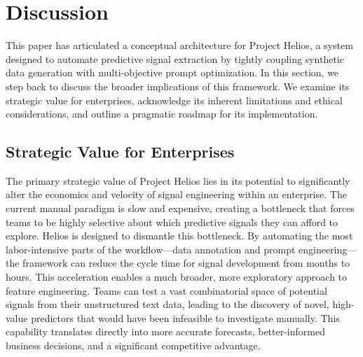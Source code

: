 \documentclass{article}
\begin{document}
\section{Discussion}
\label{sec:discussion}
This paper has articulated a conceptual architecture for Project Helios, a system designed to automate predictive signal extraction by tightly coupling synthetic data generation with multi-objective prompt optimization. In this section, we step back to discuss the broader implications of this framework. We examine its strategic value for enterprises, acknowledge its inherent limitations and ethical considerations, and outline a pragmatic roadmap for its implementation.

\subsection{Strategic Value for Enterprises}
The primary strategic value of Project Helios lies in its potential to significantly alter the economics and velocity of signal engineering within an enterprise. The current manual paradigm is slow and expensive, creating a bottleneck that forces teams to be highly selective about which predictive signals they can afford to explore. Helios is designed to dismantle this bottleneck. By automating the most labor-intensive parts of the workflow—data annotation and prompt engineering—the framework can reduce the cycle time for signal development from months to hours. This acceleration enables a much broader, more exploratory approach to feature engineering. Teams can test a vast combinatorial space of potential signals from their unstructured text data, leading to the discovery of novel, high-value predictors that would have been infeasible to investigate manually. This capability translates directly into more accurate forecasts, better-informed business decisions, and a significant competitive advantage.
\end{document}
